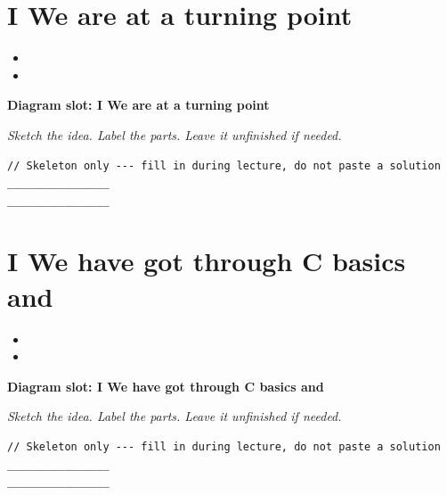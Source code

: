 \documentclass[11pt]{article}
\begin{document}
\section{I We are at a turning point}
\begin{itemize}[leftmargin=*]
  \item \hrulefill
  \vspace{2.4em}
  \item \hrulefill
  \vspace{2.4em}
\end{itemize}
\noindent\textbf{Diagram slot: I We are at a turning point}
\begin{framed}
\begin{minipage}[t][0.22\textheight]{\textwidth}
\vspace{0.4em}
\textit{Sketch the idea. Label the parts. Leave it unfinished if needed.}
\end{minipage}
\end{framed}
\vspace{1em}
\begin{lstlisting}
// Skeleton only --- fill in during lecture, do not paste a solution
________________
________________
\end{lstlisting}
\vspace{1em}
\section{I We have got through C basics and}
\begin{itemize}[leftmargin=*]
  \item \hrulefill
  \vspace{2.4em}
  \item \hrulefill
  \vspace{2.4em}
\end{itemize}
\noindent\textbf{Diagram slot: I We have got through C basics and}
\begin{framed}
\begin{minipage}[t][0.22\textheight]{\textwidth}
\vspace{0.4em}
\textit{Sketch the idea. Label the parts. Leave it unfinished if needed.}
\end{minipage}
\end{framed}
\vspace{1em}
\begin{lstlisting}
// Skeleton only --- fill in during lecture, do not paste a solution
________________
________________
\end{lstlisting}
\vspace{1em}
\end{document}
